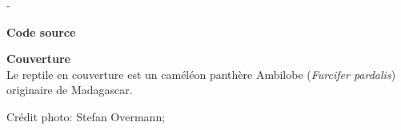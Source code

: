 
\begingroup
\calccentering{\unitlength}
\begin{adjustwidth*}{\unitlength}{-\unitlength}
  \setlength{\parindent}{0pt}
  \setlength{\parskip}{\baselineskip}

  

  \textbf{Code source} \\
  \viewsource{\ghurl}

  \textbf{Couverture} \\
  Le reptile en couverture est un caméléon panthère Ambilobe
  (\emph{Furcifer pardalis}) originaire de Madagascar.

  Crédit photo: Stefan Overmann; 
\end{adjustwidth*}
\endgroup

